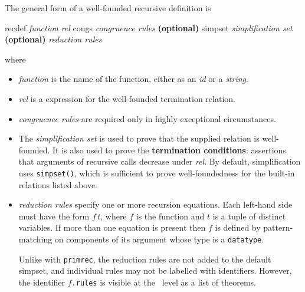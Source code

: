 The general form of a well-founded recursive definition is
\begin{ttbox}
recdef {\it function} {\it rel}
    congs   {\it congruence rules}      {\bf(optional)}
    simpset {\it simplification set}      {\bf(optional)}
   {\it reduction rules}
\end{ttbox}
where
\begin{itemize}
\item \textit{function} is the name of the function, either as an \textit{id}
  or a \textit{string}.  
  
\item \textit{rel} is a {\HOL} expression for the well-founded termination
  relation.
  
\item \textit{congruence rules} are required only in highly exceptional
  circumstances.
  
\item The \textit{simplification set} is used to prove that the supplied
  relation is well-founded.  It is also used to prove the \textbf{termination
    conditions}: assertions that arguments of recursive calls decrease under
  \textit{rel}.  By default, simplification uses \texttt{simpset()}, which
  is sufficient to prove well-foundedness for the built-in relations listed
  above. 
  
\item \textit{reduction rules} specify one or more recursion equations.  Each
  left-hand side must have the form $f\,t$, where $f$ is the function and $t$
  is a tuple of distinct variables.  If more than one equation is present then
  $f$ is defined by pattern-matching on components of its argument whose type
  is a \texttt{datatype}.  

  Unlike with \texttt{primrec}, the reduction rules are not added to the
  default simpset, and individual rules may not be labelled with identifiers.
  However, the identifier $f$\texttt{.rules} is visible at the \ML\ level
  as a list of theorems.
\end{itemize}

